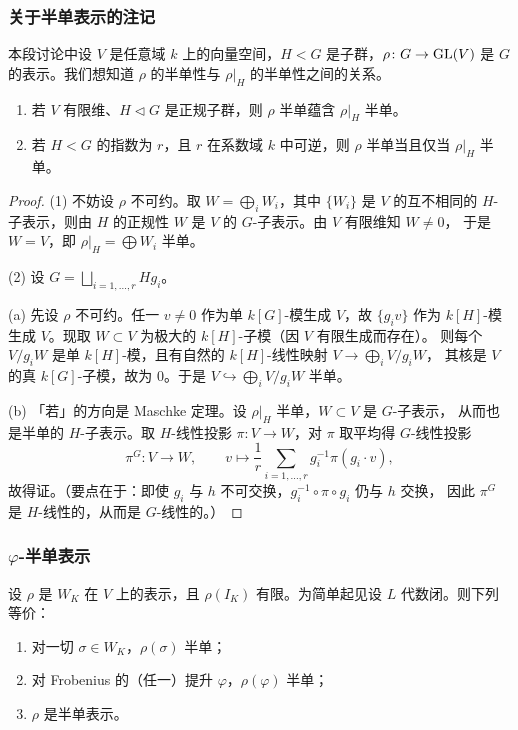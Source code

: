 \subsubsection{关于半单表示的注记}

本段讨论中设 $V$ 是任意域 $k$ 上的向量空间，$H<G$ 是子群，$\rho\colon G\to\mathrm{GL}(V)$ 是
$G$ 的表示。我们想知道 $\rho$ 的半单性与 $\rho|_H$ 的半单性之间的关系。

\begin{lemma}
\leavevmode
\begin{enumerate}[label=(\arabic*),leftmargin=2.2em]
\item 若 $V$ 有限维、$H\triangleleft G$ 是正规子群，则 $\rho$ 半单蕴含 $\rho|_H$ 半单。
\item 若 $H<G$ 的指数为 $r$，且 $r$ 在系数域 $k$ 中可逆，则 $\rho$ 半单当且仅当 $\rho|_H$ 半单。
\end{enumerate}
\end{lemma}

\begin{proof}
(1) 不妨设 $\rho$ 不可约。取 $W=\bigoplus_i W_i$，其中 $\{W_i\}$ 是 $V$ 的互不相同的
$H$-子表示，则由 $H$ 的正规性 $W$ 是 $V$ 的 $G$-子表示。由 $V$ 有限维知 $W\neq 0$，
于是 $W=V$，即 $\rho|_H=\bigoplus W_i$ 半单。

(2) 设 $G=\bigsqcup_{i=1,\dots,r}Hg_i$。

(a) 先设 $\rho$ 不可约。任一 $v\neq 0$ 作为单 $k[G]$-模生成 $V$，故 $\{g_iv\}$ 作为
$k[H]$-模生成 $V$。现取 $W\subset V$ 为极大的 $k[H]$-子模（因 $V$ 有限生成而存在）。
则每个 $V/g_iW$ 是单 $k[H]$-模，且有自然的 $k[H]$-线性映射 $V\to\bigoplus_i V/g_iW$，
其核是 $V$ 的真 $k[G]$-子模，故为 $0$。于是 $V\hookrightarrow\bigoplus_i V/g_iW$ 半单。

(b) 「若」的方向是 Maschke 定理。设 $\rho|_H$ 半单，$W\subset V$ 是 $G$-子表示，
从而也是半单的 $H$-子表示。取 $H$-线性投影 $\pi\colon V\to W$，对 $\pi$ 取平均得
$G$-线性投影
\[
\pi^{G}\colon V\longrightarrow W,\qquad
v\longmapsto\frac{1}{r}\sum_{i=1,\dots,r}g_i^{-1}\pi(g_i\cdot v),
\]
故得证。（要点在于：即使 $g_i$ 与 $h$ 不可交换，$g_i^{-1}\circ\pi\circ g_i$ 仍与 $h$ 交换，
因此 $\pi^{G}$ 是 $H$-线性的，从而是 $G$-线性的。）
\end{proof}

\subsubsection{$\varphi$-半单表示}

\begin{lemma}
设 $\rho$ 是 $W_K$ 在 $V$ 上的表示，且 $\rho(I_K)$ 有限。为简单起见设 $L$ 代数闭。则下列等价：
\begin{enumerate}[label=(\arabic*),leftmargin=2.2em]
\item 对一切 $\sigma\in W_K$，$\rho(\sigma)$ 半单；
\item 对 Frobenius 的（任一）提升 $\varphi$，$\rho(\varphi)$ 半单；
\item $\rho$ 是半单表示。
\end{enumerate}
\end{lemma}

